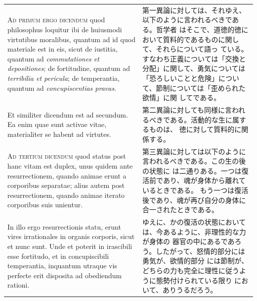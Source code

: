\documentclass[paper=a4paper,fontsize=10pt,jafontsize=9pt,titlepage]{jlreq}
\begin{document}
\begin{longtable}{p{21em}p{21em}}
\\

 {\scshape Ad primum ergo dicendum} quod philosophus loquitur ibi de
 huiusmodi virtutibus moralibus, quantum ad id quod materiale est in
 eis, sicut de iustitia, quantum ad {\itshape commutationes et
 depositiones}; de fortitudine, quantum ad {\itshape terribilia et
 pericula}; de temperantia, quantum ad {\itshape concupiscentias
 pravas}.
 
&

 第一異論に対しては、それゆえ、以下のように言われるべきである。哲学者
 はそこで、道徳的徳において質料的であるものに関して、それらについて語っ
 ている。すなわち正義については「交換と分配」に関して、勇気については
 「恐ろしいことと危険」について、節制については「歪められた欲情」に関
 してである。

\\


 Et similiter dicendum est ad secundum. Ea enim quae sunt activae
 vitae, materialiter se habent ad virtutes.

 
&

第二異論に対しても同様に言われるべきである。活動的な生に属するものは、
徳に対して質料的に関係する。

 
\\

 {\scshape Ad tertium dicendum} quod status post hanc vitam est
 duplex, unus quidem ante resurrectionem, quando animae erunt a
 corporibus separatae; alius autem post resurrectionem, quando animae
 iterato corporibus suis unientur.
 
&

 第三異論に対しては以下のように言われるべきである。この生の後の状態に
 は二通りある。一つは復活前であり、魂が身体から離れているときである。
 もう一つは復活後であり、魂が再び自分の身体に合一されたときである。

\\

 In illo ergo resurrectionis statu,
 erunt vires irrationales in organis corporis, sicut et nunc
 sunt. Unde et poterit in irascibili esse fortitudo, et in
 concupiscibili temperantia, inquantum utraque vis perfecte erit
 disposita ad obediendum rationi.
 
&

 ゆえに、かの復活の状態においては、今あるように、非理性的な力が身体の
 器官の中にあるであろう。したがって、怒情的部分には勇気が、欲情的部分
 には節制が、どちらの力も完全に理性に従うように態勢付けられている限り
 において、ありうるだろう。


\end{longtable}
\end{document}
